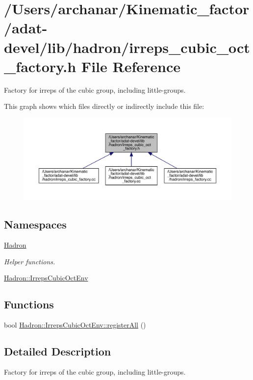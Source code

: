 \hypertarget{adat-devel_2lib_2hadron_2irreps__cubic__oct__factory_8h}{}\section{/\+Users/archanar/\+Kinematic\+\_\+factor/adat-\/devel/lib/hadron/irreps\+\_\+cubic\+\_\+oct\+\_\+factory.h File Reference}
\label{adat-devel_2lib_2hadron_2irreps__cubic__oct__factory_8h}


Factory for irreps of the cubic group, including little-\/groups.  


This graph shows which files directly or indirectly include this file\+:
\nopagebreak
\begin{figure}[H]
\begin{center}
\leavevmode
\includegraphics[width=350pt]{d7/dfe/adat-devel_2lib_2hadron_2irreps__cubic__oct__factory_8h__dep__incl}
\end{center}
\end{figure}
\subsection*{Namespaces}
\begin{DoxyCompactItemize}
\item 
 \mbox{\hyperlink{namespaceHadron}{Hadron}}
\begin{DoxyCompactList}\small\item\em Helper functions. \end{DoxyCompactList}\item 
 \mbox{\hyperlink{namespaceHadron_1_1IrrepsCubicOctEnv}{Hadron\+::\+Irreps\+Cubic\+Oct\+Env}}
\end{DoxyCompactItemize}
\subsection*{Functions}
\begin{DoxyCompactItemize}
\item 
bool \mbox{\hyperlink{namespaceHadron_1_1IrrepsCubicOctEnv_add350f077e8bf956336f99fe5dc1c29d}{Hadron\+::\+Irreps\+Cubic\+Oct\+Env\+::register\+All}} ()
\end{DoxyCompactItemize}


\subsection{Detailed Description}
Factory for irreps of the cubic group, including little-\/groups. 

